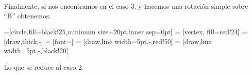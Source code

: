 \documentclass[dcc,sol]{fcfmcourse}
\begin{document}
Finalmente, si nos encontramos en el caso 3. y hacemos una rotación simple sobre ``B'' obtenemos:\\
\begin{center}


=[circle,fill=black!25,minimum size=20pt,inner sep=0pt]
 = [vertex, fill=red!24]
 = [draw,thick,-]
 = [font=\small]
 = [draw,line width=5pt,-,red!50]
 = [draw,line width=5pt,-,black!20]


\end{center}
Lo que se reduce al caso 2.
\newpage
\end{document}
